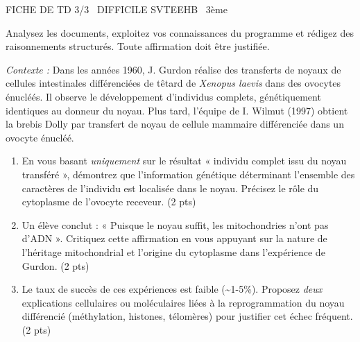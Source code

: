 \documentclass[11pt]{article}
\begin{document}
\begin{tcolorbox}[enhanced,colback=popink,colframe=popink,arc=10pt,boxrule=0pt,left=12pt,right=12pt,top=9pt,bottom=9pt]
{\color{white}\popxbold\small FICHE DE TD 3/3 \textbullet\ DIFFICILE \hfill SVTEEHB \textbullet\ 3ème\par}
\end{tcolorbox}
\vspace{4pt}
\noindent\small{Analysez les documents, exploitez vos connaissances du programme et rédigez des raisonnements structurés. Toute affirmation doit être justifiée.}

\begin{exercice}
\emph{Contexte :} Dans les années 1960, J. Gurdon réalise des transferts de noyaux de cellules intestinales différenciées de têtard de \emph{Xenopus laevis} dans des ovocytes énucléés. Il observe le développement d'individus complets, génétiquement identiques au donneur du noyau. Plus tard, l'équipe de I. Wilmut (1997) obtient la brebis Dolly par transfert de noyau de cellule mammaire différenciée dans un ovocyte énucléé.

\begin{enumerate}
    \item En vous basant \emph{uniquement} sur le résultat « individu complet issu du noyau transféré », démontrez que l'information génétique déterminant l'ensemble des caractères de l'individu est localisée dans le noyau. Précisez le rôle du cytoplasme de l'ovocyte receveur. \hfill (2 pts)
    \item Un élève conclut : « Puisque le noyau suffit, les mitochondries n'ont pas d'ADN ». Critiquez cette affirmation en vous appuyant sur la nature de l'héritage mitochondrial et l'origine du cytoplasme dans l'expérience de Gurdon. \hfill (2 pts)
    \item Le taux de succès de ces expériences est faible (\textasciitilde 1-5\%). Proposez \emph{deux} explications cellulaires ou moléculaires liées à la reprogrammation du noyau différencié (méthylation, histones, télomères) pour justifier cet échec fréquent. \hfill (2 pts)
\end{enumerate}
\end{exercice}
\end{document}
